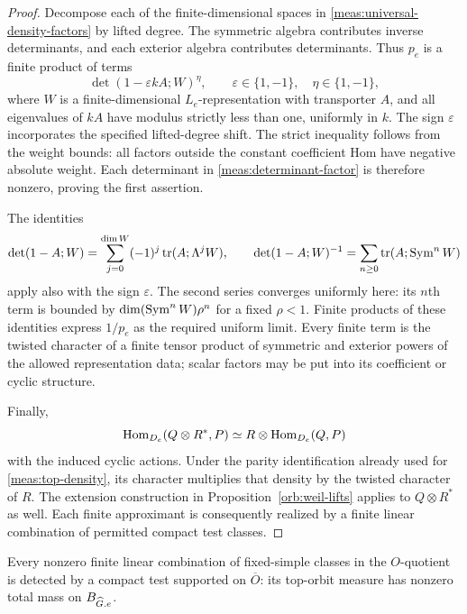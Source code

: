 \begin{proof}
Decompose each of the finite-dimensional spaces in
\eqref{meas:universal-density-factors} by lifted degree.  The symmetric
algebra contributes inverse determinants, and each exterior algebra
contributes determinants.  Thus $p_e$ is a finite product of terms
\begin{equation}\label{meas:determinant-factor}
 \det(1-\varepsilon kA;W)^{\eta},
 \qquad \varepsilon\in\{1,-1\},\quad \eta\in\{1,-1\},
\end{equation}
where $W$ is a finite-dimensional $L_e$-representation with transporter
$A$, and all eigenvalues of $kA$ have modulus strictly less than one,
uniformly in $k$.  The sign $\varepsilon$ incorporates the specified
lifted-degree shift.  The strict inequality follows from the weight
bounds: all factors outside the constant coefficient Hom have negative
absolute weight.  Each determinant in \eqref{meas:determinant-factor} is
therefore nonzero, proving the first assertion.

The identities
\[
 \det(1-A;W)=\sum_{j=0}^{\dim W}(-1)^j
                         \operatorname{tr}(A;\Lambda^jW),
 \qquad
 \det(1-A;W)^{-1}=\sum_{n\geq0}
                         \operatorname{tr}(A;\operatorname{Sym}^nW)
\]
apply also with the sign $\varepsilon$.  The second series converges
uniformly here: its $n$th term is bounded by
$\dim(\operatorname{Sym}^nW)\rho^n$ for a fixed $\rho<1$.  Finite products of these
identities express $1/p_e$ as the required uniform limit.  Every finite
term is the twisted character of a finite tensor product of symmetric and
exterior powers of the allowed representation data; scalar factors may
be put into its coefficient or cyclic structure.

Finally,
\[
 \operatorname{Hom}_{D_e}(Q\otimes R^*,P)
 \simeq R\otimes\operatorname{Hom}_{D_e}(Q,P)
\]
with the induced cyclic actions.  Under the parity identification already
used for \eqref{meas:top-density}, its character multiplies that density
by the twisted character of $R$.  The extension construction in
Proposition~\ref{orb:weil-lifts} applies to $Q\otimes R^*$ as well.  Each
finite approximant is consequently realized by a finite linear
combination of permitted compact test classes.
\end{proof}

\begin{lemma}\label{meas:top-detection}
Every nonzero finite linear combination of fixed-simple classes in the
$O$-quotient is detected by a compact test supported on $\overline O$:
its top-orbit measure has nonzero total mass on $B_{\widehat G.e}$.
\end{lemma}

